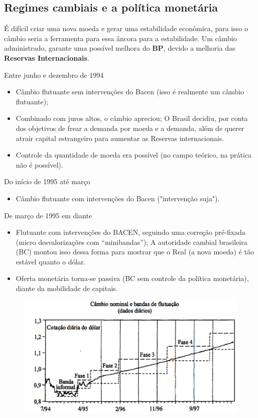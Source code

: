 \documentclass[a4paper,12pt]{article}[abntex2]
\begin{document}
\subsection{\textbf{Regimes cambiais e a política monetária}}
É difícil criar uma nova moeda e gerar uma estabilidade econômica, para isso o câmbio seria a ferramenta para essa âncora para a estabilidade. Um câmbio administrado, garante uma possível melhora do \textbf{BP}, devido a melhoria das \textbf{Reservas Internacionais}.

Entre junho e dezembro de 1994\begin{itemize}
    \item Câmbio flutuante sem intervenções do Bacen (isso é realmente um câmbio flutuante);
    \item Combinado com juros altos, o câmbio apreciou; O Brasil decidiu, por conta dos objetivos de frear a demanda por moeda e a demanda, além de querer atrair capital estrangeiro para aumentar as Reservas internacionais.
    \item Controle da quantidade de moeda era possível (no campo teórico, na prática não é possível).
\end{itemize}

Do início de 1995 até março\begin{itemize}
    \item Câmbio flutuante com intervenções do Bacen ("intervenção suja").
\end{itemize}

De março de 1995 em diante\begin{itemize}
    \item Flutuante com intervenções do BACEN, seguindo uma correção pré-fixada (micro desvalorizações com “minibandas”); A autoridade cambial brasileira (BC) montou isso dessa forma para mostrar que o Real (a nova moeda) é tão estável quanto o dólar.
    \item Oferta monetária torna-se passiva (BC sem controle da política monetária), diante da mobilidade de capitais.
\end{itemize}

\begin{figure}[H]
    \centering
    \includegraphics[width=0.7\linewidth]{Imagens/a14i11.png}
\end{figure}
\end{document}
